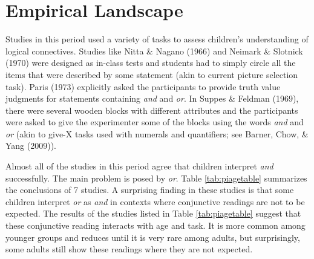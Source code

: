 \documentclass[oneside]{report}
\theoremstyle{definition}
\theoremstyle{definition}
\theoremstyle{definition}
\theoremstyle{remark}
\begin{document}
\section{Empirical Landscape}\label{empirical-landscape}

Studies in this period used a variety of tasks to assess children's
understanding of logical connectives. Studies like Nitta \& Nagano
(1966) and Neimark \& Slotnick (1970) were designed as in-class tests
and students had to simply circle all the items that were described by
some statement (akin to current picture selection task). Paris (1973)
explicitly asked the participants to provide truth value judgments for
statements containing \emph{and} and \emph{or}. In Suppes \& Feldman
(1969), there were several wooden blocks with different attributes and
the participants were asked to give the experimenter some of the blocks
using the words \emph{and} and \emph{or} (akin to give-X tasks used with
numerals and quantifiers; see Barner, Chow, \& Yang (2009)).

Almost all of the studies in this period agree that children interpret
\emph{and} successfully. The main problem is posed by \emph{or}. Table
\ref{tab:piagetable} summarizes the conclusions of 7 studies. A
surprising finding in these studies is that some children interpret
\emph{or} as \emph{and} in contexts where conjunctive readings are not
to be expected. The results of the studies listed in Table
\ref{tab:piagetable} suggest that these conjunctive reading interacts
with age and task. It is more common among younger groups and reduces
until it is very rare among adults, but surprisingly, some adults still
show these readings where they are not expected.
\end{document}
